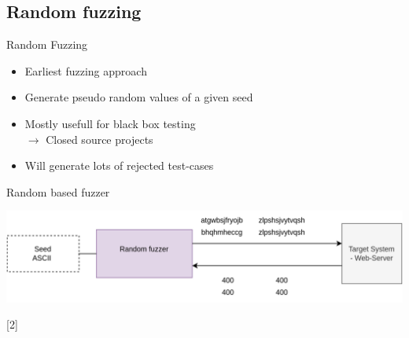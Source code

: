 \documentclass{beamer}
\begin{document}
\subsection{Random fuzzing}
\begin{frame}{Random Fuzzing}
 \begin{itemize}
 \item Earliest fuzzing approach
  \item Generate pseudo random values of a given seed
  \item Mostly usefull for black box testing\\
  $\rightarrow$ Closed source projects
    \item Will generate lots of rejected test-cases

 \end{itemize}

\end{frame}
\begin{frame}{Random based fuzzer}
\vspace{20mm}
\begin{center}
 \includegraphics[scale=0.15]{basic2.png}
 \end{center}
 \vspace{25mm}
 \small{[2]}
 \end{frame}
\end{document}
